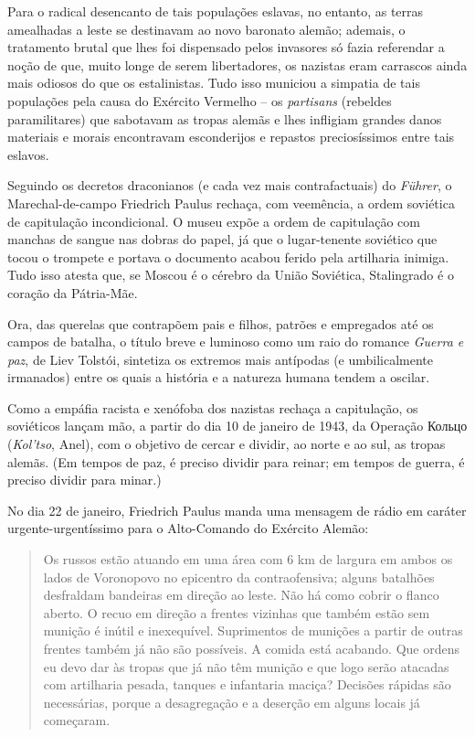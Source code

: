 Para o radical desencanto de tais populações eslavas, no entanto, as
terras amealhadas a leste se destinavam ao novo baronato alemão;
ademais, o tratamento brutal que lhes foi dispensado pelos invasores só
fazia referendar a noção de que, muito longe de serem libertadores, os
nazistas eram carrascos ainda mais odiosos do que os estalinistas. Tudo
isso municiou a simpatia de tais populações pela causa do Exército
Vermelho -- os \emph{partisans} (rebeldes paramilitares) que sabotavam
as tropas alemãs e lhes infligiam grandes danos materiais e morais
encontravam esconderijos e repastos preciosíssimos entre tais eslavos.

Seguindo os decretos draconianos (e cada vez mais contrafactuais) do
\emph{Führer}, o Marechal-de-campo Friedrich Paulus rechaça, com
veemência, a ordem soviética de capitulação incondicional. O museu expõe
a ordem de capitulação com manchas de sangue nas dobras do papel, já que
o lugar-tenente soviético que tocou o trompete e portava o documento
acabou ferido pela artilharia inimiga. Tudo isso atesta que, se Moscou é
o cérebro da União Soviética, Stalingrado é o coração da Pátria-Mãe.

Ora, das querelas que contrapõem pais e filhos, patrões e empregados até
os campos de batalha, o título breve e luminoso como um raio do romance
\emph{Guerra e paz}, de Liev Tolstói, sintetiza os extremos mais
antípodas (e umbilicalmente irmanados) entre os quais a história e a
natureza humana tendem a oscilar.

Como a empáfia racista e xenófoba dos nazistas rechaça a capitulação, os
soviéticos lançam mão, a partir do dia 10 de janeiro de 1943, da
Operação Кольцо (\emph{Kol'tso}, Anel), com o objetivo de cercar e
dividir, ao norte e ao sul, as tropas alemãs. (Em tempos de paz, é
preciso dividir para reinar; em tempos de guerra, é preciso dividir para
minar.)

No dia 22 de janeiro, Friedrich Paulus manda uma mensagem de rádio em
caráter urgente-urgentíssimo para o Alto-Comando do Exército Alemão:

\begin{quote}
Os russos estão atuando em uma área com 6 km de largura em ambos os
lados de Voronopovo no epicentro da contraofensiva; alguns batalhões
desfraldam bandeiras em direção ao leste. Não há como cobrir o flanco
aberto. O recuo em direção a frentes vizinhas que também estão sem
munição é inútil e inexequível. Suprimentos de munições a partir de
outras frentes também já não são possíveis. A comida está acabando. Que
ordens eu devo dar às tropas que já não têm munição e que logo serão
atacadas com artilharia pesada, tanques e infantaria maciça? Decisões
rápidas são necessárias, porque a desagregação e a deserção em alguns
locais já começaram.
\end{quote}

